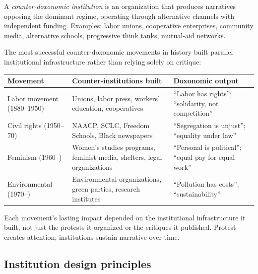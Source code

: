\begin{definition}
\label{def:counter-institution}
A \emph{counter-doxonomic institution} is an organization that produces narratives opposing the dominant regime, operating through alternative channels with independent funding.
Examples: labor unions, cooperative enterprises, community media, alternative schools, progressive think tanks, mutual-aid networks.
\end{definition}

The most successful counter-doxonomic movements in history built parallel institutional infrastructure rather than relying solely on critique:

\begin{example}
\label{ex:counter-institutions}
\begin{center}
\begin{tabular}{p{3cm}p{4cm}p{4.5cm}}
\toprule
Movement & Counter-institutions built & Doxonomic output \\
\midrule
Labor movement (1880--1950) & Unions, labor press, workers' education, cooperatives & ``Labor has rights''; ``solidarity, not competition'' \\[4pt]
Civil rights (1950--70) & NAACP, SCLC, Freedom Schools, Black newspapers & ``Segregation is unjust''; ``equality under law'' \\[4pt]
Feminism (1960--) & Women's studies programs, feminist media, shelters, legal organizations & ``Personal is political''; ``equal pay for equal work'' \\[4pt]
Environmental (1970--) & Environmental organizations, green parties, research institutes & ``Pollution has costs''; ``sustainability'' \\
\bottomrule
\end{tabular}
\end{center}
Each movement's lasting impact depended on the institutional infrastructure it built, not just the protests it organized or the critiques it published.
Protest creates attention; institutions sustain narrative over time.
\end{example}

\subsection{Institution design principles}

